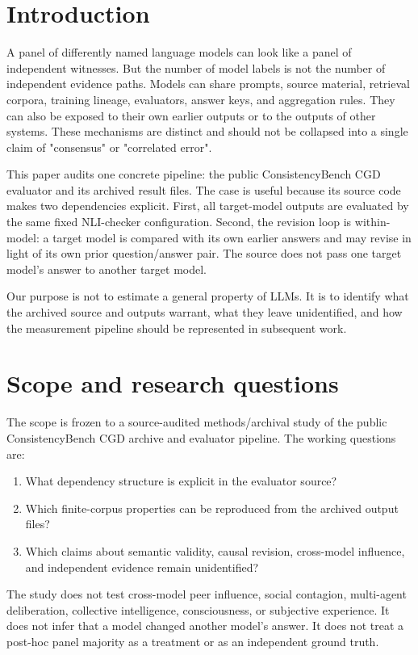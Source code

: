 \documentclass[11pt]{article}
\begin{document}
\section{Introduction}
A panel of differently named language models can look like a panel of independent witnesses. But the number of model labels is not the number of independent evidence paths. Models can share prompts, source material, retrieval corpora, training lineage, evaluators, answer keys, and aggregation rules. They can also be exposed to their own earlier outputs or to the outputs of other systems. These mechanisms are distinct and should not be collapsed into a single claim of "consensus" or "correlated error".

This paper audits one concrete pipeline: the public ConsistencyBench CGD evaluator and its archived result files. The case is useful because its source code makes two dependencies explicit. First, all target-model outputs are evaluated by the same fixed NLI-checker configuration. Second, the revision loop is within-model: a target model is compared with its own earlier answers and may revise in light of its own prior question/answer pair. The source does not pass one target model's answer to another target model.

Our purpose is not to estimate a general property of LLMs. It is to identify what the archived source and outputs warrant, what they leave unidentified, and how the measurement pipeline should be represented in subsequent work.

\section{Scope and research questions}
The scope is frozen to a source-audited methods/archival study of the public ConsistencyBench CGD archive and evaluator pipeline. The working questions are:
\begin{enumerate}
  \item What dependency structure is explicit in the evaluator source?
  \item Which finite-corpus properties can be reproduced from the archived output files?
  \item Which claims about semantic validity, causal revision, cross-model influence, and independent evidence remain unidentified?
\end{enumerate}

The study does not test cross-model peer influence, social contagion, multi-agent deliberation, collective intelligence, consciousness, or subjective experience. It does not infer that a model changed another model's answer. It does not treat a post-hoc panel majority as a treatment or as an independent ground truth.
\end{document}
